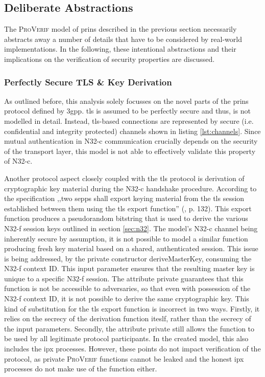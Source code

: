 \subsection{Deliberate Abstractions}

The \textsc{ProVerif} model of \gls{prins} described in the previous section necessarily abstracts away a number of details that have to be considered by real-world implementations.
In the following, these intentional abstractions and their implications on the verification of security properties are discussed.

\subsubsection{Perfectly Secure TLS \& Key Derivation}

As outlined before, this analysis solely focusses on the novel parts of the \gls{prins} protocol defined by \gls{3gpp}.
\gls{tls} is assumed to be perfectly secure and thus, is not modelled in detail.
Instead, \gls{tls}-based connections are represented by secure (i.e. confidential and integrity protected) channels shown in listing \ref{lst:channels}.
Since mutual authentication in N32-c communication crucially depends on the security of the transport layer, this model is not able to effectively validate this property of N32-c.

Another protocol aspect closely coupled with the \gls{tls} protocol is derivation of cryptographic key material during the N32-c handshake procedure.
According to the specification ,,two \glspl{sepp} shall export keying material from the \gls{tls} session established between them using the \gls{tls} export function'' (\cite{3gpp.33.501}, p. 132).
This export function produces a pseudorandom bitstring that is used to derive the various N32-f session keys outlined in section \ref{sec:n32}.
The model's N32-c channel being inherently secure by assumption, it is not possible to model a similar function producing fresh key material based on a shared, authenticated session.
This issue is being addressed, by the private constructor {\sffamily deriveMasterKey}, consuming the N32-f context ID.
This input parameter ensures that the resulting master key is unique to a specific N32-f session.
The attribute {\sffamily private} guarantees that this function is not be accessible to adversaries, so that even with possession of the N32-f context ID, it is not possible to derive the same cryptographic key.
This kind of substitution for the \gls{tls} export function is incorrect in two ways. Firstly, it relies on the secrecy of the derivation function iteslf, rather than the secrecy of the input parameters.
Secondly, the attribute {\sffamily private} still allows the function to be used by all legitimate protocol participants.
In the created model, this also includes the \gls{ipx} processes.
However, these points do not impact verification of the protocol, as private \textsc{ProVerif} functions cannot be leaked and the honest \gls{ipx} processes do not make use of the function either.


